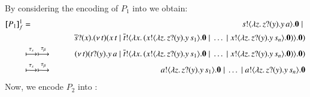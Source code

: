 \noi 
By considering the encoding of $P_1$ into \HO   
we obtain:
\begin{eqnarray*}
[\!\![P_1]\!\!]^{1}_f & = &  	s ! \langle \lambda z.\,z ? (y) . y\, {a} \rangle . \mathbf{0} \;|\; \\
& & \quad \quad \overline{s} ? (x) . (\nu\, t)(x\, {t} \;|\; \overline{t} ! \langle \lambda x.\,(x ! \langle \lambda z.\,z ? (y) . y\, {s_1} \rangle . \mathbf{0} \;|\; \dots \;|\; x ! \langle \lambda z.\,z ? (y) . y\, {s_n} \rangle . \mathbf{0}) \rangle . \mathbf{0})\\
	& \stackrel{\tau_{s}}{\longmapsto} \stackrel{\tau_{\beta}}{\longmapsto} & 
	(\nu\, t)(t ? (y) . y\, {a} \;|\; \overline{t} ! \langle \lambda x.\,(x ! \langle \lambda z.\,z ? (y) . y\, {s_1} \rangle . \mathbf{0} \;|\; \dots \;|\; x ! \langle \lambda z.\,z ? (y) . y\, {s_n} \rangle . \mathbf{0}) \rangle . \mathbf{0})\\
	& \stackrel{\tau_{s}}{\longmapsto}\stackrel{\tau_{\beta}}{\longmapsto}  & 
	a ! \langle \lambda z.\,z ? (y) . y\, {s_1} \rangle . \mathbf{0} \;|\; \dots \;|\; a ! \langle \lambda z.\,z ? (y) . y\, {s_n} \rangle . \mathbf{0}
\end{eqnarray*}
Now, we encode $P_2$ into \sessp:
